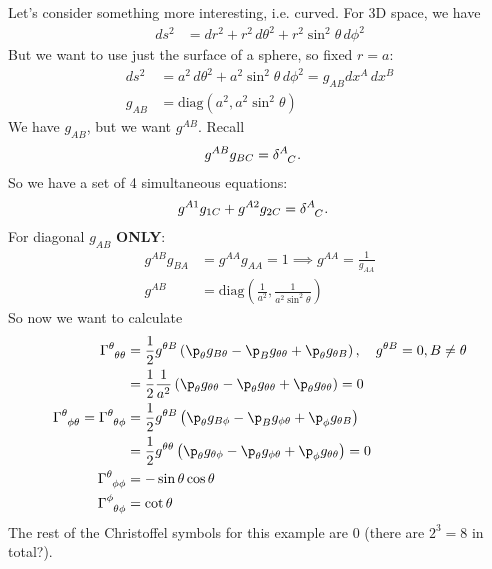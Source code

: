 \documentclass[a4paper, 11pt, normalem]{report}
\begin{document}
Let's consider something more interesting, i.e. curved. 
For 3D space, we have
\begin{align}
    ds^2 &= dr^2 + r^2\,d\theta^2 + r^2\sin^2\theta\,d\phi^2 
\end{align}
But we want to use just the surface of a sphere, so fixed $r=a$:
\begin{align}
    ds^2 &= a^2\,d\theta^2 + a^2\sin^2\theta\,d\phi^2 = g_{AB}dx^A\,dx^B \\
    g_{AB} &= \text{diag}(a^2,a^2\sin^2\theta)
\end{align}
We have $g_{AB}$, but we want $g^{AB}$. Recall
\begin{align}
    g^{AB}g_{BC} &= \tensor{\delta}{^A_C}.
\end{align}
So we have a set of 4 simultaneous equations:
\begin{align}
    g^{A1}g_{1C} + g^{A2}g_{2C} &= \tensor{\delta}{^A_C}.
\end{align}
For diagonal $g_{AB}$ \textbf{ONLY}:
\begin{align}
    g^{AB}g_{BA} &= g^{AA}g_{AA} = 1 \implies g^{AA} = \frac{1}{g_{AA}} \\
    g^{AB} &= \text{diag}\left(\frac{1}{a^2},\frac{1}{a^2\sin^2\theta}\right)
\end{align}
So now we want to calculate
\begin{align}
    \tensor{\Gamma}{^\theta_{\theta\theta}} &= \frac12 g^{\theta B} \left(\p_\theta g_{B\theta} - \p_B g_{\theta\theta} + \p_{\theta} g_{\theta B}\right), \quad g^{\theta B} = 0, B\neq\theta \\
                                            &= \frac12 \frac{1}{a^2}\left(\p_{\theta} g_{\theta\theta} - \p_\theta g_{\theta\theta} + \p_\theta g_{\theta\theta}\right) =  0 \\
    \tensor{\Gamma}{^\theta_{\phi\theta}} = \tensor{\Gamma}{^\theta_{\theta\phi}} &= \frac12 g^{\theta B}\left(\p_\theta g_{B\phi} - \p_B g_{\phi\theta} + \p_\phi g_{\theta B}\right) \\
                                          &= \frac12 g^{\theta\theta}\left(\p_\theta g_{\theta\phi} - \p_\theta g_{\phi\theta} + \p_\phi g_{\theta\theta}\right) = 0 \\
    \tensor{\Gamma}{^\theta_{\phi\phi}} &= -\sin\theta\cos\theta \\
    \tensor{\Gamma}{^\phi_{\theta\phi}} &= \cot\theta
\end{align}
The rest of the Christoffel symbols for this example are 0 (there are $2^3=8$ in total?).
\end{document}

